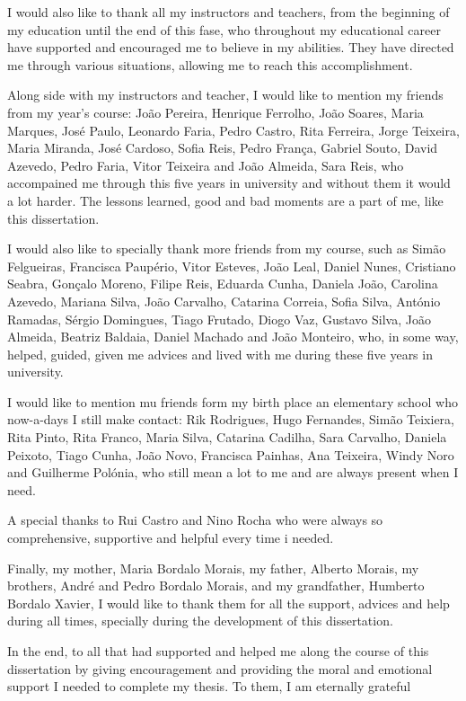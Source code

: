 I would also like to thank all my instructors and teachers, from the beginning of my education until the end of this fase, who throughout my educational career have supported and encouraged me to believe in my abilities. They have directed me through various situations, allowing me to reach this accomplishment.

Along side with my instructors and teacher, I would like to mention my friends from  my year's course: João Pereira, Henrique Ferrolho, João Soares, Maria Marques, José Paulo, Leonardo Faria, Pedro Castro, Rita Ferreira, Jorge Teixeira, Maria Miranda, José Cardoso, Sofia Reis, Pedro França, Gabriel Souto, David Azevedo, Pedro Faria, Vitor Teixeira and João Almeida, Sara Reis, who accompained me through this five years in university and without them it would a lot harder. The lessons learned, good and bad moments are a part of me, like this dissertation.

I would also like to specially thank more friends from my course, such as Simão Felgueiras, Francisca Paupério, Vitor Esteves, João Leal, Daniel Nunes, Cristiano Seabra,  Gonçalo Moreno, Filipe Reis, Eduarda Cunha, Daniela João, Carolina Azevedo, Mariana Silva, João Carvalho, Catarina Correia, Sofia Silva, António Ramadas, Sérgio Domingues,  Tiago Frutado, Diogo Vaz, Gustavo Silva, João Almeida, Beatriz Baldaia, Daniel Machado and João Monteiro, who, in some way, helped, guided, given me advices and lived with me during these five years in university.


I would like to mention mu friends form my birth place an elementary school who now-a-days I still make contact: Rik Rodrigues, Hugo Fernandes, Simão Teixiera, Rita Pinto, Rita Franco, Maria Silva, Catarina Cadilha, Sara Carvalho, Daniela Peixoto, Tiago Cunha, João Novo, Francisca Painhas, Ana Teixeira, Windy Noro and Guilherme Polónia, who still mean a lot to me and are always present when I need.

A special thanks to Rui Castro and Nino Rocha who were always so comprehensive, supportive and helpful every time i needed.

Finally, my mother, Maria Bordalo Morais, my father, Alberto Morais, my brothers, André and Pedro Bordalo Morais, and my grandfather, Humberto Bordalo Xavier, I would like to thank them for all the support, advices and help during all times, specially during the development of this dissertation.

In the end, to all that had supported and helped me along the course of this dissertation by giving
encouragement and providing the moral and emotional support I needed to complete my thesis.
To them, I am eternally grateful

\vspace{10mm}
